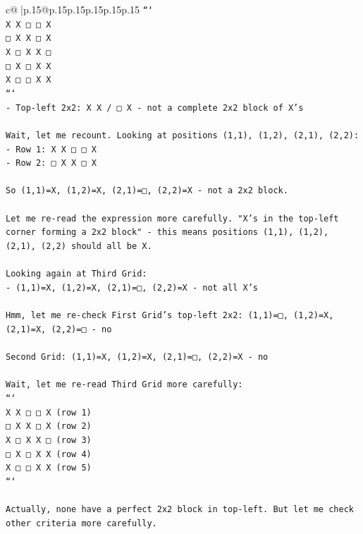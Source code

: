 \documentclass{article}
\begin{document}
{\begin{supertabular}{c@{$\;$}|p{.15\linewidth}@{}p{.15\linewidth}p{.15\linewidth}p{.15\linewidth}p{.15\linewidth}p{.15\linewidth}}
{{{\texttt{```} \\
\texttt{X X □ □ X} \\
\texttt{□ X X □ X} \\
\texttt{X □ X X □} \\
\texttt{□ X □ X X} \\
\texttt{X □ □ X X} \\
\texttt{```} \\
\texttt{{-} Top{-}left 2x2: X X / □ X {-} not a complete 2x2 block of X's} \\
\\ 
\texttt{Wait, let me recount. Looking at positions (1,1), (1,2), (2,1), (2,2):} \\
\texttt{{-} Row 1: X X □ □ X} \\
\texttt{{-} Row 2: □ X X □ X} \\
\\ 
\texttt{So (1,1)=X, (1,2)=X, (2,1)=□, (2,2)=X {-} not a 2x2 block.} \\
\\ 
\texttt{Let me re{-}read the expression more carefully. "X's in the top{-}left corner forming a 2x2 block" {-} this means positions (1,1), (1,2), (2,1), (2,2) should all be X.} \\
\\ 
\texttt{Looking again at Third Grid:} \\
\texttt{{-} (1,1)=X, (1,2)=X, (2,1)=□, (2,2)=X {-} not all X's} \\
\\ 
\texttt{Hmm, let me re{-}check First Grid's top{-}left 2x2: (1,1)=□, (1,2)=X, (2,1)=X, (2,2)=□ {-} no} \\
\\ 
\texttt{Second Grid: (1,1)=X, (1,2)=X, (2,1)=□, (2,2)=X {-} no} \\
\\ 
\texttt{Wait, let me re{-}read Third Grid more carefully:} \\
\texttt{```} \\
\texttt{X X □ □ X  (row 1)} \\
\texttt{□ X X □ X  (row 2)} \\
\texttt{X □ X X □  (row 3)} \\
\texttt{□ X □ X X  (row 4)} \\
\texttt{X □ □ X X  (row 5)} \\
\texttt{```} \\
\\ 
\texttt{Actually, none have a perfect 2x2 block in top{-}left. But let me check other criteria more carefully.} \\
}}}
\end{supertabular}}
\end{document}

